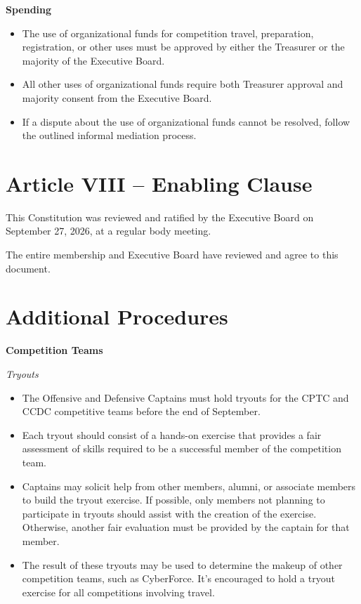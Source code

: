\documentclass[12pt]{article}
\begin{document}
\textbf{Spending}
\begin{itemize}
  \item The use of organizational funds for competition travel, preparation, registration, or other uses must be approved by either the Treasurer or the majority of the Executive Board.
  \item All other uses of organizational funds require both Treasurer approval and majority consent from the Executive Board.
  \item If a dispute about the use of organizational funds cannot be resolved, follow the outlined informal mediation process.
\end{itemize}

\section*{Article VIII -- Enabling Clause}

This Constitution was reviewed and ratified by the Executive Board on September 27, 2026, at a regular body meeting.

The entire membership and Executive Board have reviewed and agree to this document.

\section*{Additional Procedures}

\textbf{Competition Teams}

\textit{Tryouts}
\begin{itemize}
  \item The Offensive and Defensive Captains must hold tryouts for the CPTC and CCDC competitive teams before the end of September.
  \item Each tryout should consist of a hands-on exercise that provides a fair assessment of skills required to be a successful member of the competition team.
  \item Captains may solicit help from other members, alumni, or associate members to build the tryout exercise. If possible, only members not planning to participate in tryouts should assist with the creation of the exercise. Otherwise, another fair evaluation must be provided by the captain for that member.
  \item The result of these tryouts may be used to determine the makeup of other competition teams, such as CyberForce. It's encouraged to hold a tryout exercise for all competitions involving travel.
\end{itemize}
\end{document}
